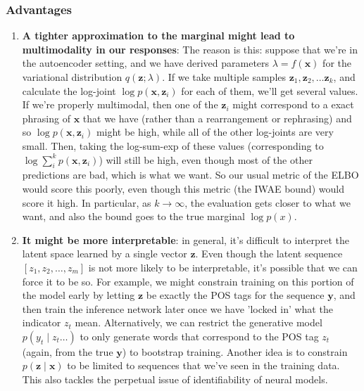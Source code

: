 \documentclass[12pt]{article}
\theoremstyle{definition}
\theoremstyle{remark}
\renewcommand{\v}[1]{\mathbf{#1}}
\begin{document}
\subsubsection*{Advantages} 
\begin{enumerate}
	\item \textbf{A tighter approximation to the marginal might lead to multimodality in our responses}: The reason is this: suppose that we're in the autoencoder setting, and we have derived parameters $\lambda = f(\v x)$ for the variational distribution $q(\v z; \lambda)$. If we take multiple samples $\v z_1, \v z_2, \ldots \v z_k$, and calculate the log-joint $\log p(\v x, \v z_i)$ for each of them, we'll get several values. If we're properly multimodal, then one of the $\v z_i$ might correspond to a exact phrasing of $\v x$ that we have (rather than a rearrangement or rephrasing) and so $\log p(\v x, \v z_i)$ might be high, while all of the other log-joints are very small. Then, taking the log-sum-exp of these values (corresponding to $\log \sum_{i}^k p(\v x, \v z_i)$) will still be high, even though most of the other predictions are bad, which is what we want. So our usual metric of the ELBO would score this poorly, even though this metric (the IWAE bound) would score it high. In particular, as $k \to \infty$, the evaluation gets closer to what we want, and also the bound goes to the true marginal $\log p(x)$. 
	\item \textbf{It might be more interpretable}: in general, it's difficult to interpret the latent space learned by a single vector $\v z$. Even though the latent sequence $[z_1, z_2, \ldots, z_m]$ is not more likely to be interpretable, it's possible that we can force it to be so. For example, we might constrain training on this portion of the model early by letting $\v z$ be exactly the POS tags for the sequence $\v y$, and then train the inference network later once we have 'locked in' what the indicator $z_t$ mean. Alternatively, we can restrict the generative model $p(y_t \mid z_t \ldots)$ to only generate words that correspond to the POS tag $z_t$ (again, from the true $\v y$) to bootstrap training. Another idea is to constrain $p(\v z \mid \v x)$ to be limited to sequences that we've seen in the training data. This also tackles the perpetual issue of identifiability of neural models. 
\end{enumerate}
\end{document}
